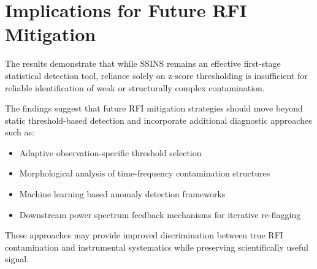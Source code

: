 \documentclass{article}
\begin{document}
\section{Implications for Future RFI Mitigation}
The results demonstrate that while SSINS remains an effective first-stage statistical detection tool, reliance solely on z-score thresholding is insufficient for reliable identification of weak or structurally complex contamination.

The findings suggest that future RFI mitigation strategies should move beyond static threshold-based detection and incorporate additional diagnostic approaches such as:
\begin{itemize}
\item Adaptive observation-specific threshold selection
\item Morphological analysis of time-frequency contamination structures
\item Machine learning based anomaly detection frameworks
\item Downstream power spectrum feedback mechanisms for iterative re-flagging
\end{itemize}
These approaches may provide improved discrimination between true RFI contamination and instrumental systematics while preserving scientifically useful signal.



\end{document}
